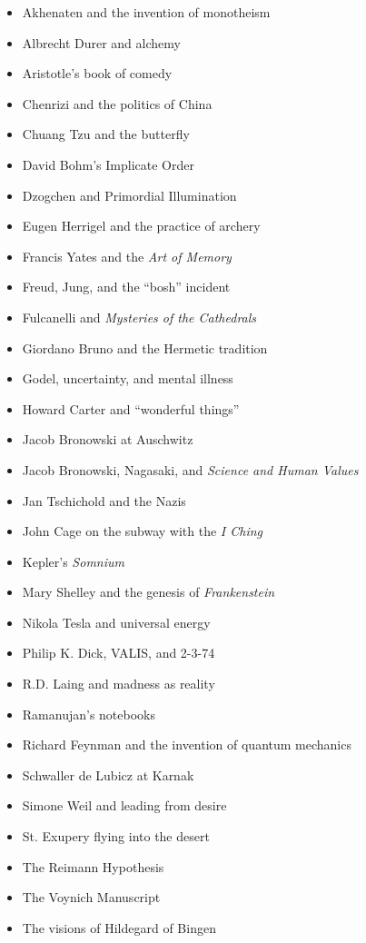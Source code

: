 \documentclass[letterpaper,10pt,headsepline]{scrreprt}
\begin{document}
\begin{itemize}
\item Akhenaten and the invention of monotheism
\item Albrecht Durer and alchemy
\item Aristotle's book of comedy
\item Chenrizi and the politics of China
\item Chuang Tzu and the butterfly
\item David Bohm's Implicate Order
\item Dzogchen and Primordial Illumination
\item Eugen Herrigel and the practice of archery
\item Francis Yates and the \textit{Art of Memory}
\item Freud, Jung, and the ``bosh'' incident
\item Fulcanelli and \textit{Mysteries of the Cathedrals}
\item Giordano Bruno and the Hermetic tradition
\item Godel, uncertainty, and mental illness
\item Howard Carter and ``wonderful things''
\item Jacob Bronowski at Auschwitz
\item Jacob Bronowski, Nagasaki, and \textit{Science and Human Values}
\item Jan Tschichold and the Nazis
\item John Cage on the subway with the \textit{I Ching}
\item Kepler's \textit{Somnium}
\item Mary Shelley and the genesis of \textit{Frankenstein}
\item Nikola Tesla and universal energy
\item Philip K. Dick, VALIS, and 2-3-74
\item R.D. Laing and madness as reality
\item Ramanujan's notebooks
\item Richard Feynman and the invention of quantum mechanics
\item Schwaller de Lubicz at Karnak
\item Simone Weil and leading from desire
\item St. Exupery flying into the desert
\item The Reimann Hypothesis
\item The Voynich Manuscript
\item The visions of Hildegard of Bingen

\end{itemize}
\end{document}
